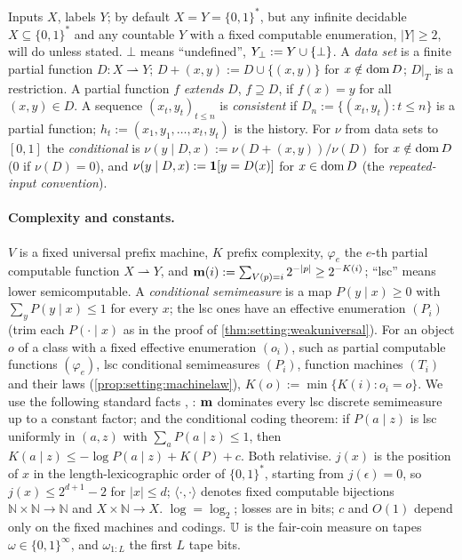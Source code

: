 \begin{definition}[Data]\label{def:setting:data}
Inputs $X$, labels $Y$; by default $X=Y=\{0,1\}^*$, but any infinite decidable $X\subseteq\{0,1\}^*$ and any countable $Y$ with a fixed computable enumeration, $|Y|\ge2$, will do unless stated. $\bot$ means ``undefined'', $Y_{\bot}:=Y\cup\{\bot\}$. A \emph{data set} is a finite partial function $D:X\rightharpoonup Y$; $D+(x,y):=D\cup\{(x,y)\}$ for $x\notin\operatorname{dom} D$; $D|_T$ is a restriction. A partial function $f$ \emph{extends} $D$, $f\supseteq D$, if $f(x)=y$ for all $(x,y)\in D$. A sequence $(x_t,y_t)_{t\le n}$ is \emph{consistent} if $D_n:=\{(x_t,y_t):t\le n\}$ is a partial function; $h_t:=(x_1,y_1,\dots,x_t,y_t)$ is the history. For $\nu$ from data sets to $[0,1]$ the \emph{conditional} is $\nu(y\mid D,x):=\nu(D+(x,y))/\nu(D)$ for $x\notin\operatorname{dom} D$ ($0$ if $\nu(D)=0$), and $\nu(y\mid D,x):=\mathbf{1}[y=D(x)]$ for $x\in\operatorname{dom} D$ (the \emph{repeated-input convention}).
\end{definition}

\paragraph{Complexity and constants.} $V$ is a fixed universal prefix machine, $K$ prefix complexity, $\varphi_e$ the $e$-th partial computable function $X\rightharpoonup Y$, and $\mathbf{m}(i):=\sum_{V(p)=i}2^{-|p|}\ge2^{-K(i)}$; ``lsc'' means lower semicomputable. A \emph{conditional semimeasure} is a map $P(y\mid x)\ge0$ with $\sum_yP(y\mid x)\le1$ for every $x$; the lsc ones have an effective enumeration $(P_i)$ (trim each $P(\cdot\mid x)$ as in the proof of \cref{thm:setting:weakuniversal}). For an object $o$ of a class with a fixed effective enumeration $(o_i)$, such as partial computable functions $(\varphi_e)$, lsc conditional semimeasures $(P_i)$, function machines $(T_i)$ and their laws (\cref{prop:setting:machinelaw}), $K(o):=\min\{K(i):o_i=o\}$. We use the following standard facts \citep{levin1974laws,gacs1974symmetry,chaitin1975theory}, \citep[\S4.3]{li2008introduction}: $\mathbf{m}$ dominates every lsc discrete semimeasure up to a constant factor; and the conditional coding theorem: if $P(a\mid z)$ is lsc uniformly in $(a,z)$ with $\sum_aP(a\mid z)\le1$, then $K(a\mid z)\le-\log P(a\mid z)+K(P)+c$. Both relativise. $j(x)$ is the position of $x$ in the length-lexicographic order of $\{0,1\}^*$, starting from $j(\epsilon)=0$, so $j(x)\le2^{d+1}-2$ for $|x|\le d$; $\langle\cdot,\cdot\rangle$ denotes fixed computable bijections $\mathbb N\times\mathbb N\to\mathbb N$ and $X\times\mathbb N\to X$. $\log=\log_2$; losses are in bits; $c$ and $O(1)$ depend only on the fixed machines and codings. $\mathbb{U}$ is the fair-coin measure on tapes $\omega\in\{0,1\}^\infty$, and $\omega_{1:L}$ the first $L$ tape bits.

